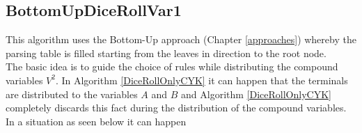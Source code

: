 \subsection{BottomUpDiceRollVar1}
This algorithm uses the Bottom-Up approach (Chapter \ref{approaches}) whereby the parsing table is filled starting from the leaves in direction to the root node.\\
The basic idea is to guide the choice of rules while distributing the compound variables $V^2$. In Algorithm \ref{DiceRollOnlyCYK} it can happen that the terminals are distributed to the variables $A$ and $B$ and Algorithm \ref{DiceRollOnlyCYK} completely discards this fact during the distribution of the compound variables. In a situation as seen below it can happen \\
\noindent
\begin{figure}[h]
	\begin{minipage}{6in}
		\centering
		\hspace*{.2in}
\end{minipage}
\end{figure}
